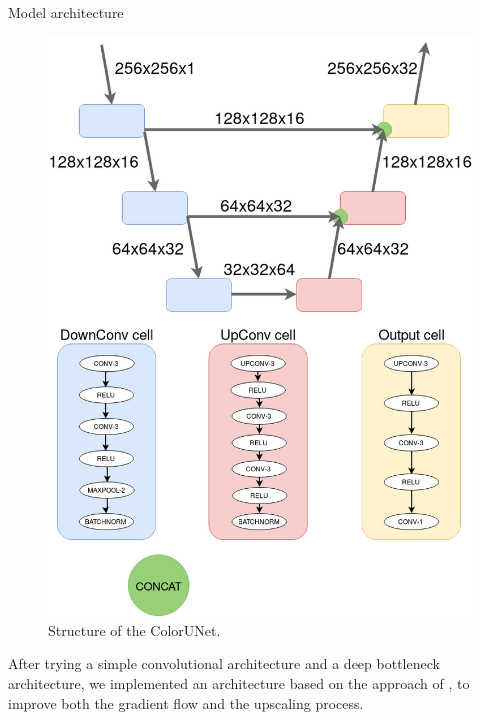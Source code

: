 \documentclass[final]{beamer}
\newlength{\onecolwid}
\begin{document}
\begin{frame}[t]
\begin{columns}[t]
\begin{column}{\onecolwid}
\begin{block}{Model architecture}

  \begin{figure}
  \begin{center}
  \includegraphics[width=.5\linewidth]{diagram}
  \caption{Structure of the ColorUNet.}
  \label{structure}
  \end{center}
  \end{figure}

After trying a simple convolutional architecture and a deep bottleneck architecture, we implemented an architecture based on the approach of \cite{ronneberger2015unet}, to improve both the gradient flow and the upscaling process.

\end{block}






\end{column}
\end{columns}
\end{frame}
\end{document}
